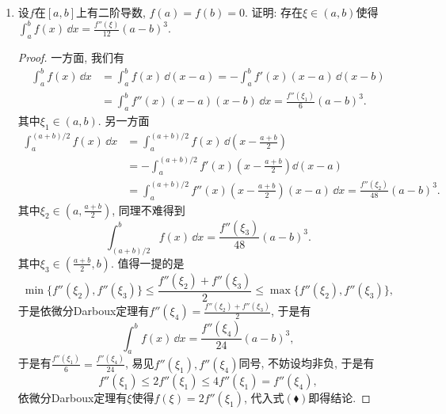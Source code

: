 \begin{quiza}
\begin{enumerate}
\begin{proof}
事实上,\[\int_{2n\pi}^{(2n+1)\pi}\ee^{-x^2}\sin x\,\dd x
+\int_{(2n+1)\pi}^{(2n+2)\pi}\ee^{-x^2}\sin x\,\dd x
=\int_{2n\pi}^{(2n+1)\pi}\sin t\left(\ee^{-x^2}-\ee^{-(x+\pi)^2}\right)>0.\]
结论即证.
\end{proof}

\item 设\(f\)在\([a,b]\)上有二阶导数, \(f(a)=f(b)=0\). 
证明: 存在\(\xi\in(a,b)\)使得\(\int_{a}^{b}f(x)\,\dd x=\frac{f''(\xi)}{12}(a-b)^3.\)
\begin{proof}
一方面, 我们有
\begin{equation*}\tag{$\blacklozenge$}\label{reno1}
\begin{split}
\int_{a}^{b}f(x)\,\dd x&=\int_{a}^{b}f(x)\,\dd(x-a)
=-\int_{a}^{b}f'(x)(x-a)\,\dd (x-b)\\
&=\int_{a}^{b}f''(x)(x-a)(x-b)\,\dd x=\frac{f''(\xi_1)}{6}(a-b)^3.
\end{split}
\end{equation*}
其中\(\xi_1\in(a,b)\). 另一方面\[\begin{split}
\int_{a}^{(a+b)/2}f(x)\,\dd x
&=\int_{a}^{(a+b)/2}f(x)\,\dd\left(x-\frac{a+b}{2}\right)\\
&=-\int_{a}^{(a+b)/2}f'(x)\left(x-\frac{a+b}{2}\right)\dd (x-a)\\
&=\int_{a}^{(a+b)/2}f''(x)\left(x-\frac{a+b}{2}\right)(x-a)\,\dd x
=\frac{f''(\xi_2)}{48}(a-b)^3.
\end{split}\]其中\(\xi_2\in\left(a,\frac{a+b}{2}\right)\), 同理不难得到
\[\int_{(a+b)/2}^{b}f(x)\,\dd x=\frac{f''(\xi_3)}{48}(a-b)^3.\]
其中\(\xi_3\in\left(\frac{a+b}{2},b\right)\). 值得一提的是
\[\min\{f''(\xi_2),f''(\xi_3)\}\leqslant\frac{f''(\xi_2)+f''(\xi_3)}{2}
\leqslant\max\{f''(\xi_2),f''(\xi_3)\},\] 
于是依微分Darboux定理有\(f''(\xi_4)=\frac{f''(\xi_2)+f''(\xi_3)}{2}\), 于是有
\[\int_{a}^{b}f(x)\,\dd x=\frac{f''(\xi_4)}{24}(a-b)^3,\] 
于是有\(\frac{f''(\xi_1)}{6}=\frac{f''(\xi_4)}{24}\), 
易见\(f''(\xi_1),f''(\xi_4)\)同号, 不妨设均非负, 于是有
\[f''(\xi_1)\leqslant 2f''(\xi_1)\leqslant  4f''(\xi_1)=f''(\xi_4),\]
依微分Darboux定理有\(\xi\)使得\(f(\xi)=2f''(\xi_1)\), 代入式$(\blacklozenge)$即得结论.
\end{proof}


\end{enumerate}
\end{quiza}
